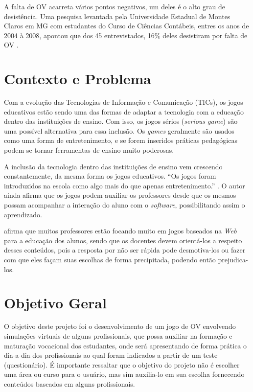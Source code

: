 \documentclass[
	12pt,				%
    oneside,			%
	a4paper,			%
	english,			%
	french,				%
	spanish,			%
	brazil,				%
	]{abntex2}
\begin{document}
A falta de OV acarreta vários pontos negativos, um deles é o alto grau de desistência. Uma pesquisa levantada pela Universidade Estadual de Montes Claros em MG com estudantes do Curso de Ciências Contábeis, entres os anos de 2004 à 2008, apontou que dos 45 entrevistados, 16\% deles desistiram por falta de OV \cite{evasao}.

\section{Contexto e Problema}

Com a evolução das Tecnologias de Informação e Comunicação (TICs), os jogos educativos estão sendo uma das formas de adaptar a tecnologia com a educação dentro das instituições de ensino. Com isso, os jogos sérios (\textit{serious game}) são uma possível alternativa para essa inclusão.
Os \textit{games} geralmente são usados como uma forma de entretenimento, e se forem inseridos práticas pedagógicas podem se tornar ferramentas de ensino muito poderosas.

A inclusão da tecnologia dentro das instituições de ensino vem crescendo constantemente, da mesma forma os jogos educativos. \enquote{Os jogos foram introduzidos na escola como algo mais do que apenas entretenimento.} \cite{gros}. O autor ainda afirma que os jogos podem auxiliar os professores desde que os mesmos possam acompanhar a interação do aluno com o \textit{software}, possibilitando assim o aprendizado.

 afirma que muitos professores estão focando muito em jogos baseados na \textit{Web} para a educação dos alunos, sendo que os docentes devem orientá-los a respeito desses conteúdos, pois a resposta por não ser rápida pode desmotiva-los ou fazer com que eles façam suas escolhas de forma precipitada, podendo então prejudica-los.

\section{Objetivo Geral}

O objetivo deste projeto foi o desenvolvimento de um jogo de OV envolvendo simulações virtuais de alguns profissionais, que possa auxiliar na formação e maturação vocacional dos estudantes, onde será apresentando de forma prática o dia-a-dia dos profissionais ao qual foram indicados a partir de um teste (questionário).
É importante ressaltar que o objetivo do projeto não é escolher uma área ou curso para o usuário, mas sim auxilia-lo em sua escolha fornecendo conteúdos baseados em alguns profissionais.
\end{document}
